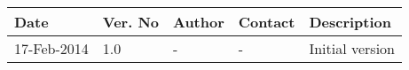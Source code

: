 \begin{center}
    \begin{tabular}{ | l | p{1cm} | l | l | p{5cm} |}
    \hline
    Date&Ver. No & Author &Contact &Description         									 \\ \hline
	17-Feb-2014&1.0 & - & - & Initial version                                         \\
    \hline
    \end{tabular}
\end{center} 